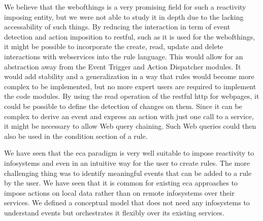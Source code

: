 We believe that the \textrm{\gls{webofthings}} is a very promising field for such a reactivity imposing entity, but we were not able to study it in depth due to the lacking accessability of such things.
By reducing the interaction in term of event detection and action imposition to \textrm{\acrshort{rest}ful}, such as it is used for the \textrm{\gls{webofthings}}, it might be possible to incorporate the create, read, update and delete interactions with \textrm{\glspl{webservice}} into the rule language.
This would allow for an abstraction away from the \textrm{Event Trigger} and \textrm{Action Dispatcher} modules.
It would add stability and a generalization in a way that rules would become more complex to be implemented, but no more expert users are required to implement the code modules.
By using the read operation of the \textrm{\acrshort{rest}ful} \textrm{\acrshort{http}} for webpages, it could be possible to define the detection of changes on them.
Since it can be complex to derive an event and express an action with just one call to a service, it might be necessary to allow Web query chaining.
Such Web queries could then also be used in the condition section of a rule.

We have seen that the \textrm{\acrshort{eca}} paradigm is very well suitable to impose reactivity to \textrm{\glspl{infosystem}} and even in an intuitive way for the user to create rules.
The more challenging thing was to identify meaningful events that can be added to a rule by the user.
We have seen that it is common for existing \textrm{\acrshort{eca}} approaches to impose actions on local data rather than on remote \textrm{\glspl{infosystem}} over their services.
We defined a conceptual model that does not need any \textrm{\glspl{infosystem}} to understand events but orchestrates it flexibly over its existing services.


